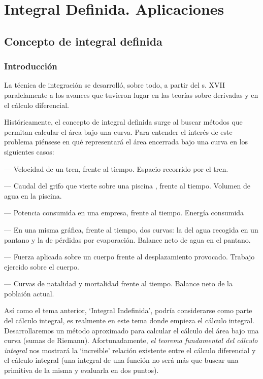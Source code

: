 \chapter{Integral Definida. Aplicaciones}


\section{Concepto de integral definida}
\subsection{Introducción}

La técnica de integración se desarrolló, sobre todo, a partir del s. XVII paralelamente a los avances que tuvieron lugar en las teorías sobre derivadas y en el cálculo diferencial.


Históricamente, el concepto de integral definida surge al buscar métodos que permitan calcular el área bajo una curva. Para entender el interés de este problema piénsese en qué representará el área encerrada bajo una curva en los siguientes casos:

--- Velocidad de un tren, frente al tiempo. \textcolor{gris}{ Espacio recorrido por el tren.}

--- Caudal del grifo que vierte sobre una piscina , frente al tiempo. \textcolor{gris}{ Volumen de agua en la piscina.}


--- Potencia consumida en una empresa, frente al tiempo. \textcolor{gris}{ Energía consumida}


--- En una misma gráfica, frente al tiempo, dos curvas: la del agua recogida en un pantano y la de pérdidas por evaporación. \textcolor{gris}{ Balance neto de agua en el pantano.}


--- Fuerza aplicada sobre un cuerpo frente al desplazamiento provocado. \textcolor{gris}{ Trabajo ejercido sobre el cuerpo.}


--- Curvas de natalidad y mortalidad frente al tiempo. \textcolor{gris}{ Balance neto de la poblaión actual.}

Así como el tema anterior, `Integral Indefinida', podría considerarse como parte del cálculo integral, es realmente en este tema donde empieza el cálculo integral. Desarrollaremos un método aproximado para calcular el cálculo del área bajo una curva  (sumas de Riemann). Afortunadamente, \emph{el teorema fundamental del cálculo integral} nos mostrará la `increible' relación existente entre el cálculo diferencial y el cálculo integral (una integral de una función no será más que buscar una primitiva de la misma y evaluarla en dos puntos).

